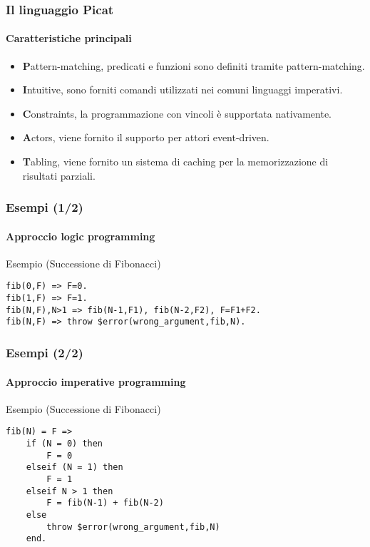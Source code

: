 \documentclass{beamer}
\begin{document}
\begin{frame}
  \frametitle{Il linguaggio Picat} \framesubtitle{Caratteristiche
    principali}
  \begin{itemize}
  \item \textbf{P}attern-matching, predicati e funzioni sono definiti
    tramite pattern-matching.
  \item \textbf{I}ntuitive, sono forniti comandi utilizzati nei comuni
    linguaggi imperativi.
  \item \textbf{C}onstraints, la programmazione con vincoli è
    supportata nativamente.
  \item \textbf{A}ctors, viene fornito il supporto per attori
    event-driven.
  \item \textbf{T}abling, viene fornito un sistema di caching per la
    memorizzazione di risultati parziali.
  \end{itemize}
\end{frame}


\begin{frame}[fragile]
  \frametitle{Esempi (1/2)}
  \framesubtitle{Approccio logic programming}
  \begin{exampleblock}{Esempio (Successione di Fibonacci)}
\begin{verbatim}
fib(0,F) => F=0.
fib(1,F) => F=1.
fib(N,F),N>1 => fib(N-1,F1), fib(N-2,F2), F=F1+F2.
fib(N,F) => throw $error(wrong_argument,fib,N).
\end{verbatim}
  \end{exampleblock}
\end{frame}


\begin{frame}[fragile]
  \frametitle{Esempi (2/2)}
  \framesubtitle{Approccio imperative programming}
  \begin{exampleblock}{Esempio (Successione di Fibonacci)}
\begin{verbatim}
fib(N) = F =>
    if (N = 0) then
        F = 0
    elseif (N = 1) then
        F = 1
    elseif N > 1 then
        F = fib(N-1) + fib(N-2)
    else 
        throw $error(wrong_argument,fib,N)
    end.
\end{verbatim}
  \end{exampleblock}
\end{frame}

\end{document}

